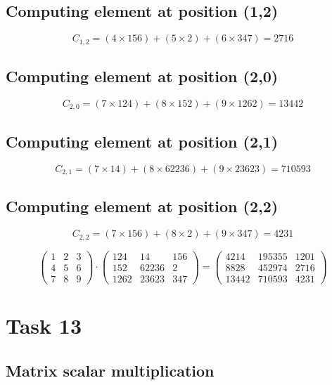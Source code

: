 \documentclass{article}
\begin{document}
\subsection*{ \vspace{1em} Computing element at position (1,2)}
\[
C_{1,2} = (4 \times 156) + (5 \times 2) + (6 \times 347) = 2716
\]
\subsection*{ \vspace{1em} Computing element at position (2,0)}
\[
C_{2,0} = (7 \times 124) + (8 \times 152) + (9 \times 1262) = 13442
\]
\subsection*{ \vspace{1em} Computing element at position (2,1)}
\[
C_{2,1} = (7 \times 14) + (8 \times 62236) + (9 \times 23623) = 710593
\]
\subsection*{ \vspace{1em} Computing element at position (2,2)}
\[
C_{2,2} = (7 \times 156) + (8 \times 2) + (9 \times 347) = 4231
\]
\medskip

\[
\begin{pmatrix}1 & 2 & 3 \\ 4 & 5 & 6 \\ 7 & 8 & 9\end{pmatrix} \cdot \begin{pmatrix}124 & 14 & 156 \\ 152 & 62236 & 2 \\ 1262 & 23623 & 347\end{pmatrix} = \begin{pmatrix}4214 & 195355 & 1201 \\ 8828 & 452974 & 2716 \\ 13442 & 710593 & 4231\end{pmatrix}
\]
\bigskip

\hrulefill
\bigskip

\section*{Task 13}

\subsection*{Matrix scalar multiplication}
\end{document}

